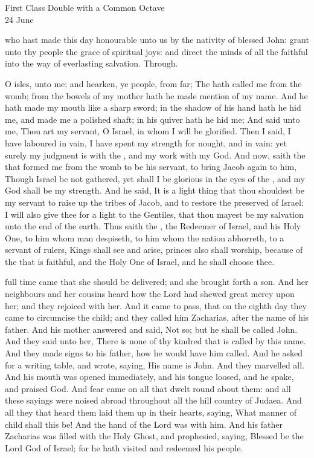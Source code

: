 \label{StJohnBaptist}
\begin{inhead}
    {First Class Double with a Common Octave\\
24 June}
\end{inhead}

\collect
{} who hast made this day honourable unto us by the nativity of blessed John: grant unto thy people the grace of spiritual joys: and direct the minds of all the faithful into the way of everlasting salvation. Through.

 O isles, unto me; and hearken, ye people, from far; The  hath called me from the womb; from the bowels of my mother hath he made mention of my name. And he hath made my mouth like a sharp sword; in the shadow of his hand hath he hid me, and made me a polished shaft; in his quiver hath he hid me; And said unto me, Thou art my servant, O Israel, in whom I will be glorified. Then I said, I have laboured in vain, I have spent my strength for nought, and in vain: yet surely my judgment is with the , and my work with my God. And now, saith the  that formed me from the womb to be his servant, to bring Jacob again to him, Though Israel be not gathered, yet shall I be glorious in the eyes of the , and my God shall be my strength. And he said, It is a light thing that thou shouldest be my servant to raise up the tribes of Jacob, and to restore the preserved of Israel: I will also give thee for a light to the Gentiles, that thou mayest be my salvation unto the end of the earth. Thus saith the , the Redeemer of Israel, and his Holy One, to him whom man despiseth, to him whom the nation abhorreth, to a servant of rulers, Kings shall see and arise, princes also shall worship, because of the  that is faithful, and the Holy One of Israel, and he shall choose thee.

 full time came that she should be delivered; and she brought forth a son. And her neighbours and her cousins heard how the Lord had shewed great mercy upon her; and they rejoiced with her. And it came to pass, that on the eighth day they came to circumcise the child; and they called him Zacharias, after the name of his father. And his mother answered and said, Not so; but he shall be called John. And they said unto her, There is none of thy kindred that is called by this name. And they made signs to his father, how he would have him called. And he asked for a writing table, and wrote, saying, His name is John. And they marvelled all. And his mouth was opened immediately, and his tongue loosed, and he spake, and praised God. And fear came on all that dwelt round about them: and all these sayings were noised abroad throughout all the hill country of Judaea. And all they that heard them laid them up in their hearts, saying, What manner of child shall this be! And the hand of the Lord was with him. And his father Zacharias was filled with the Holy Ghost, and prophesied, saying, Blessed be the Lord God of Israel; for he hath visited and redeemed his people.

